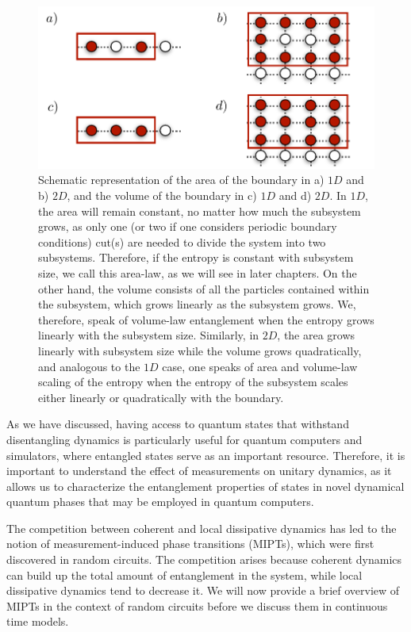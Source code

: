 \begin{figure}[ht]
    \centering
    \includegraphics[width=\textwidth]{Chapters/Plots/Chapter1/Chapter0_Fig3.pdf}
    \caption{Schematic representation of the area of the boundary in a) $1D$ and b) $2D$, and the volume of the boundary in c) $1D$ and d) $2D$. In $1D$, the area will remain constant, no matter how much the subsystem grows, as only one (or two if one considers periodic boundary conditions) cut(s) are needed to divide the system into two subsystems. Therefore, if the entropy is constant with subsystem size, we call this area-law, as we will see in later chapters. On the other hand, the volume consists of all the particles contained within the subsystem, which grows linearly as the subsystem grows. We, therefore, speak of volume-law entanglement when the entropy grows linearly with the subsystem size. Similarly, in $2D$, the area grows linearly with subsystem size while the volume grows quadratically, and analogous to the $1D$ case, one speaks of area and volume-law scaling of the entropy when the entropy of the subsystem scales either linearly or quadratically with the boundary.}
    \label{fig:Chapter0_Fig3}
\end{figure}

As we have discussed, having access to quantum states that withstand disentangling dynamics is particularly useful for quantum computers and simulators, where entangled states serve as an important resource. Therefore, it is important to understand the effect of measurements on unitary dynamics, as it allows us to characterize the entanglement properties of states in novel dynamical quantum phases that may be employed in quantum computers.

The competition between coherent and local dissipative dynamics has led to the notion of measurement-induced phase transitions (MIPTs), which were first discovered in random circuits. The competition arises because coherent dynamics can build up the total amount of entanglement in the system, while local dissipative dynamics tend to decrease it. We will now provide a brief overview of MIPTs in the context of random circuits before we discuss them in continuous time models.

